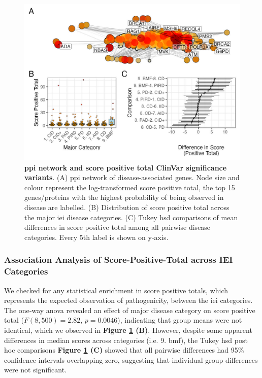 \begin{figure}[ht]
  \centering
  \includegraphics[width=\textwidth]{../images/untangleR_ppi_network_assoc_patch1.jpg}
  \caption{\textbf{\ac{ppi} network and score positive total ClinVar significance variants}.
    (A) \ac{ppi} network of disease-associated genes. Node size and colour represent the log-transformed score positive total, the top 15 genes/proteins with the highest probability of being observed in disease are labelled.
    (B) Distribution of score positive total across the major \ac{iei} disease categories.
    (C) Tukey \ac{hsd} comparisons of mean differences in score positive total among all pairwise disease categories. Every 5th label is shown on y-axis.
  }
  \label{fig:ppi_network_assoc}
\end{figure}





\FloatBarrier
\subsubsection{Association Analysis of Score-Positive-Total across IEI Categories} 

We checked for any statistical enrichment in score positive totals, which represents the expected observation of pathogenicity, between the \ac{iei} categories.
The one‐way \ac{anova} revealed an effect of major disease category on score positive total (\(F(8,500)=2.82,\,p=0.0046\)), indicating that group means were not identical, which we observed in
\textbf{Figure \ref{fig:ppi_network_assoc} (B)}.
However, despite some apparent differences in median scores across categories (i.e. 9. \ac{bmf}), the Tukey \ac{hsd} post hoc comparisons 
\textbf{Figure \ref{fig:ppi_network_assoc} (C)}
showed that all pairwise differences had 95\% confidence intervals overlapping zero, suggesting that individual group differences were not significant.

